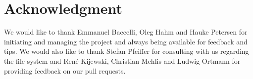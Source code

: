 \documentclass[conference]{IEEEtran}
\begin{document}
\section*{Acknowledgment}
\label{sec:Acknowledgement}
We would like to thank Emmanuel Baccelli, Oleg Hahm and Hauke Petersen
for initiating and managing the project and always being available for
feedback and tips. We would also like to thank Stefan Pfeiffer for
consulting with us regarding the file system and Ren\'{e} Kijewski,
Christian Mehlis and Ludwig Ortmann for providing feedback on our pull
requests.



\end{document}
